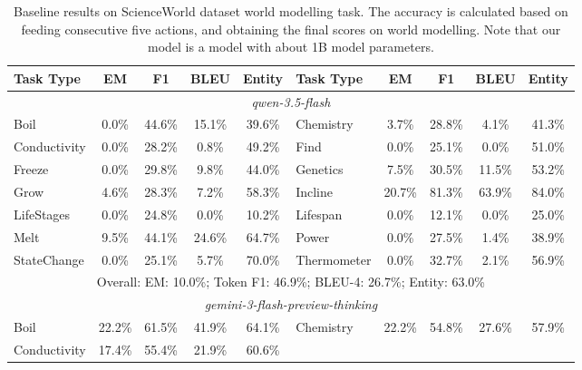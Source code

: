 \begin{table}[h]
\centering
    \setlength\tabcolsep{2.5pt}
    \setlength\extrarowheight{0pt}
\caption{Baseline results on ScienceWorld dataset \citep{wang-etal-2022-scienceworld} world modelling task. The accuracy is calculated based on feeding consecutive five actions, and obtaining the final scores on world modelling. Note that our model is a model with about 1B model parameters.}
\label{tab:scienceworldmain2}
\begin{tabular}{lcccc|lcccc}
\toprule
\textbf{Task Type} & \textbf{EM} & \textbf{F1}
  & \textbf{BLEU} & \textbf{Entity} & \textbf{Task Type} & \textbf{EM} & \textbf{F1}
  & \textbf{BLEU} & \textbf{Entity} \\
\midrule
\multicolumn{10}{c}{\textit{qwen-3.5-flash \citep{qwen35blog}}}\\
\midrule
Boil                &    0.0\%&      44.6\%&    15.1\%&      39.6\%&
Chemistry          &     3.7\%&      28.8\%&     4.1\%&      41.3\%\\
Conductivity       &     0.0\%&      28.2\%&     0.8\%&      49.2\%&
Find               &     0.0\%&      25.1\%&     0.0\%&      51.0\%\\
Freeze              &     0.0\%&      29.8\%&     9.8\%&      44.0\%&
Genetics          &     7.5\%&      30.5\%&    11.5\%&      53.2\%\\
Grow               &     4.6\%&      28.3\%&     7.2\%&      58.3\%&
Incline           &    20.7\%&      81.3\%&    63.9\%&      84.0\%\\
LifeStages          &     0.0\%&      24.8\%&     0.0\%&      10.2\%&
Lifespan            &     0.0\%&      12.1\%&     0.0\%&      25.0\%\\
Melt               &     9.5\%&      44.1\%&    24.6\%&      64.7\%&
Power               &     0.0\%&      27.5\%&     1.4\%&      38.9\%\\
StateChange         &     0.0\%&      25.1\%&     5.7\%&      70.0\%&
Thermometer         &     0.0\%&      32.7\%&     2.1\%&      56.9\%\\
\midrule
\multicolumn{10}{c}{Overall: EM: 10.0\%; Token F1: 46.9\%; BLEU-4: 26.7\%; Entity: 63.0\%}\\
\midrule
\multicolumn{10}{c}{\textit{gemini-3-flash-preview-thinking \citep{gemini3flash2025}}}\\
\midrule
Boil                &    22.2\%&      61.5\%&    41.9\%&      64.1\%&
Chemistry          &    22.2\%&      54.8\%&    27.6\%&      57.9\%\\
Conductivity       &    17.4\%&      55.4\%&    21.9\%&      60.6\%&

\end{tabular}
\end{table}
